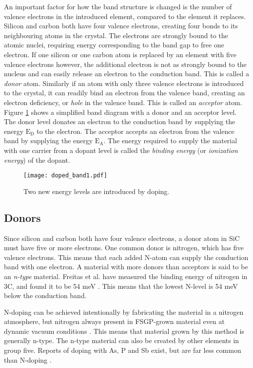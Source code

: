 An important factor for how the band structure is changed is the number of valence electrons in the introduced element, compared to the element it replaces. Silicon and carbon both have four valence electrons, creating four bonds to its neighbouring atoms in the crystal. The electrons are strongly bound to the atomic nuclei, requiring energy corresponding to the band gap to free one electron. If one silicon or one carbon atom is replaced by an element with five valence electrons however, the additional electron is not as strongly bound to the nucleus and can easily release an electron to the conduction band. This is called a \emph{donor} atom. Similarly if an atom with only three valence electrons is introduced to the crystal, it can readily bind an electron from the valence band, creating an electron deficiency, or \emph{hole} in the valence band. This is called an \emph{acceptor} atom. Figure \ref{fig:dopant_band} shows a simplified band diagram with a donor and an acceptor level. The donor level donates an electron to the conduction band by supplying the energy $\mathrm{E_D}$ to the electron. The acceptor accepts an electron from the valence band by supplying the energy $\mathrm{E_A}$. The energy required to supply the material with one carrier from a dopant level is called the \emph{binding energy} (or \emph{ionization energy}) of the dopant. 

\begin{figure}[h]
\begin{center}
\texttt{[image: doped\_band1.pdf]}
\caption{Two new energy levels are introduced by doping. 
\label{fig:dopant_band}}
\end{center}
\end{figure}

\subsection{Donors}
Since silicon and carbon both have four valence electrons, a donor atom in SiC must have five or more electrons. One common donor is nitrogen, which has five valence electrons. This means that each added N-atom can supply the conduction band with one electron. A material with more donors than acceptors is said to be an \emph{n-type} material. Freitas et al. have measured the binding energy of nitrogen in 3C, and found it to be 54 meV \cite{Freitas1988}. This means that the lowest N-level is 54 meV below the conduction band. 

N-doping can be achieved intentionally by fabricating the material in a nitrogen atmosphere, but nitrogen always present in FSGP-grown material even at dynamic vacuum conditions \cite{Sun2012b}. This means that material grown by this method is generally n-type. The n-type material can also be created by other elements in group five. Reports of doping with As, P and Sb exist, but are far less common than N-doping \cite{Rao1999}. 

